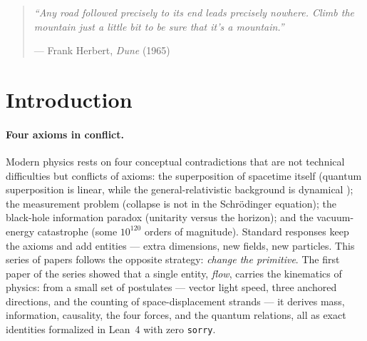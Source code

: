 \documentclass[aps,prd,preprint,superscriptaddress,amsmath,amssymb]{revtex4-2}
\begin{document}
\maketitle

\begin{quote}
\itshape
``Any road followed precisely to its end leads precisely nowhere. Climb the
mountain just a little bit to be sure that it's a mountain.''
\par
--- Frank Herbert, \textit{Dune} (1965)
\end{quote}

\section{Introduction}
\label{sec:intro}

\paragraph{Four axioms in conflict.}
Modern physics rests on four conceptual contradictions that are not
technical difficulties but conflicts of axioms: the superposition of
spacetime itself (quantum superposition is linear, while the
general-relativistic background is dynamical
\cite{einstein1915feldgleichungen}); the measurement problem (collapse
is not in the Schr\"odinger equation); the black-hole information
paradox (unitarity versus the horizon); and the vacuum-energy
catastrophe (some $10^{120}$ orders of magnitude).  Standard responses
keep the axioms and add entities --- extra dimensions, new fields, new
particles.  This series of papers follows the opposite strategy:
\emph{change the primitive}.  The first paper of the series
\cite{ProjectionPhysics,HibsPhysics} showed that a single entity,
\emph{flow}, carries the kinematics of physics: from a small set of
postulates --- vector light speed, three anchored directions, and the
counting of space-displacement strands --- it derives mass, information,
causality, the four forces, and the quantum relations, all as exact
identities formalized in Lean~4 with zero \texttt{sorry}.
\end{document}
